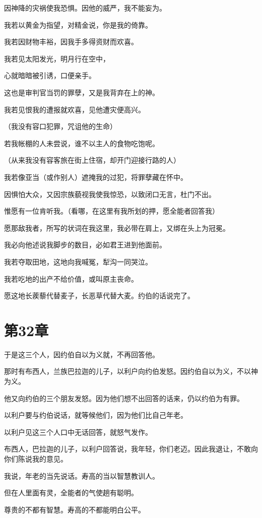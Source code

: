\documentclass[12pt,oneside]{book}
\begin{document}
因神降的灾祸使我恐惧。因他的威严，我不能妄为。

我若以黄金为指望，对精金说，你是我的倚靠。

我若因财物丰裕，因我手多得资财而欢喜。

我若见太阳发光，明月行在空中，

心就暗暗被引诱，口便亲手。

这也是审判官当罚的罪孽，又是我背弃在上的神。

我若见恨我的遭报就欢喜，见他遭灾便高兴。

（我没有容口犯罪，咒诅他的生命）

若我帐棚的人未尝说，谁不以主人的食物吃饱呢。

（从来我没有容客旅在街上住宿，却开门迎接行路的人）

我若像亚当（或作别人）遮掩我的过犯，将罪孽藏在怀中。

因惧怕大众，又因宗族藐视我使我惊恐，以致闭口无言，杜门不出。

惟愿有一位肯听我。（看哪，在这里有我所划的押，愿全能者回答我）

愿那敌我者，所写的状词在我这里，我必带在肩上，又绑在头上为冠冕。

我必向他述说我脚步的数目，必如君王进到他面前。

我若夺取田地，这地向我喊冤，犁沟一同哭泣。

我若吃地的出产不给价值，或叫原主丧命。

愿这地长蒺藜代替麦子，长恶草代替大麦。约伯的话说完了。


\chapter{第32章}
于是这三个人，因约伯自以为义就，不再回答他。

那时有布西人，兰族巴拉迦的儿子，以利户向约伯发怒。因约伯自以为义，不以神为义。

他又向约伯的三个朋友发怒。因为他们想不出回答的话来，仍以约伯为有罪。

以利户要与约伯说话，就等候他们，因为他们比自己年老。

以利户见这三个人口中无话回答，就怒气发作。

布西人，巴拉迦的儿子，以利户回答说，我年轻，你们老迈。因此我退让，不敢向你们陈说我的意见。

我说，年老的当先说话。寿高的当以智慧教训人。

但在人里面有灵，全能者的气使趟有聪明。

尊贵的不都有智慧。寿高的不都能明白公平。
\end{document}
